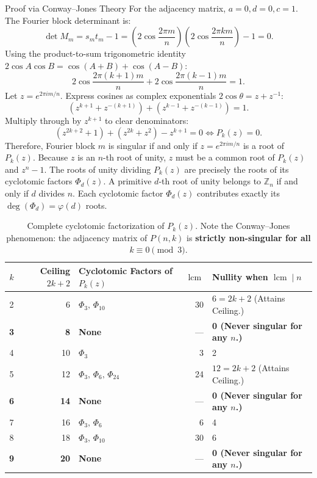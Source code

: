\documentclass[11pt]{article}
\begin{document}
\begin{defbox}{Proof via Conway--Jones Theory}
For the adjacency matrix, $a=0, d=0, c=1$. The Fourier block determinant is:
\begin{equation}
  \det M_m = s_m t_m - 1 = \left(2\cos\frac{2\pi m}{n}\right)\left(2\cos\frac{2\pi km}{n}\right) - 1 = 0.
\end{equation}
Using the product-to-sum trigonometric identity $2\cos A \cos B = \cos(A+B) + \cos(A-B)$:
\begin{equation}
  2\cos\frac{2\pi(k+1)m}{n} + 2\cos\frac{2\pi(k-1)m}{n} = 1.
\end{equation}
Let $z = e^{2\pi i m / n}$. Express cosines as complex exponentials $2\cos\theta = z + z^{-1}$:
\begin{equation}
  (z^{k+1} + z^{-(k+1)}) + (z^{k-1} + z^{-(k-1)}) = 1.
\end{equation}
Multiply through by $z^{k+1}$ to clear denominators:
\begin{equation}
  (z^{2k+2} + 1) + (z^{2k} + z^2) - z^{k+1} = 0 \iff P_k(z) = 0.
\end{equation}
Therefore, Fourier block $m$ is singular if and only if $z = e^{2\pi i m / n}$ is a root of $P_k(z)$.
Because $z$ is an $n$-th root of unity, $z$ must be a common root of $P_k(z)$ and $z^n - 1$.
The roots of unity dividing $P_k(z)$ are precisely the roots of its cyclotomic factors $\Phi_d(z)$.
A primitive $d$-th root of unity belongs to $\mathbb{Z}_n$ if and only if $d$ divides $n$.
Each cyclotomic factor $\Phi_d(z)$ contributes exactly its $\deg(\Phi_d) = \varphi(d)$ roots. \qedhere
\end{defbox}

\begin{table}[htbp]
\centering
\begin{tabular}{crlrl}
\toprule
$k$ & Ceiling $2k+2$ & Cyclotomic Factors of $P_k(z)$ & $\operatorname{lcm}$ & Nullity when $\operatorname{lcm} \mid n$ \\
\midrule
2 & 6 & $\Phi_3, \, \Phi_{10}$ & 30 & $6 = 2k+2$ (Attains Ceiling.) \\
\textbf{3} & \textbf{8} & \textbf{None} & --- & \textbf{0 (Never singular for any $n$.)} \\
4 & 10 & $\Phi_3$ & 3 & 2 \\
5 & 12 & $\Phi_3, \, \Phi_6, \, \Phi_{24}$ & 24 & $12 = 2k+2$ (Attains Ceiling.) \\
\textbf{6} & \textbf{14} & \textbf{None} & --- & \textbf{0 (Never singular for any $n$.)} \\
7 & 16 & $\Phi_3, \, \Phi_6$ & 6 & 4 \\
8 & 18 & $\Phi_3, \, \Phi_{10}$ & 30 & 6 \\
\textbf{9} & \textbf{20} & \textbf{None} & --- & \textbf{0 (Never singular for any $n$.)} \\
\bottomrule
\end{tabular}
\caption{Complete cyclotomic factorization of $P_k(z)$. Note the Conway--Jones phenomenon: the adjacency matrix of $P(n,k)$ is \textbf{strictly non-singular for all $k \equiv 0 \pmod 3$}.}
\label{tab:adj_class}
\end{table}
\end{document}
